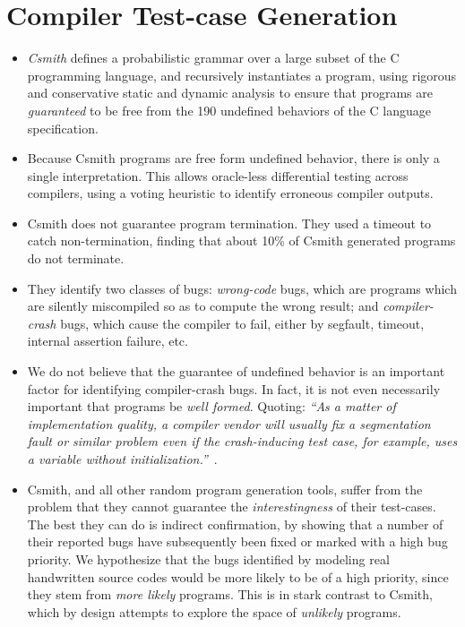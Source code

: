 \section{Compiler Test-case Generation}\label{sec:motivation}

\begin{itemize}
	\item \emph{Csmith} defines a probabilistic grammar over a large subset of the C programming language, and recursively instantiates a program, using rigorous and conservative static and dynamic analysis to ensure that programs are \emph{guaranteed} to be free from the 190 undefined behaviors of the C language specification.
	\item Because Csmith programs are free form undefined behavior, there is only a single interpretation. This allows oracle-less differential testing across compilers, using a voting heuristic to identify erroneous compiler outputs.
	\item Csmith does not guarantee program termination. They used a timeout to catch non-termination, finding that about 10\% of Csmith generated programs do not terminate.
	\item They identify two classes of bugs: \emph{wrong-code} bugs, which are programs which are silently miscompiled so as to compute the wrong result; and \emph{compiler-crash} bugs, which cause the compiler to fail, either by segfault, timeout, internal assertion failure, etc.
	\item We do not believe that the guarantee of undefined behavior is an important factor for identifying compiler-crash bugs. In fact, it is not even necessarily important that programs be \emph{well formed}. Quoting: 
	\emph{``As a matter of implementation quality, a compiler vendor will usually fix a segmentation fault or similar problem even if the crash-inducing test case, for example, uses a variable without initialization.''}~\cite{Regehr2012a}.
	\item Csmith, and all other random program generation tools, suffer from the problem that they cannot guarantee the \emph{interestingness} of their test-cases. The best they can do is indirect confirmation, by showing that a number of their reported bugs have subsequently been fixed or marked with a high bug priority. We hypothesize that the bugs identified by modeling real handwritten source codes would be more likely to be of a high priority, since they stem from \emph{more likely} programs. This is in stark contrast to Csmith, which by design attempts to explore the space of \emph{unlikely} programs.

\end{itemize}
